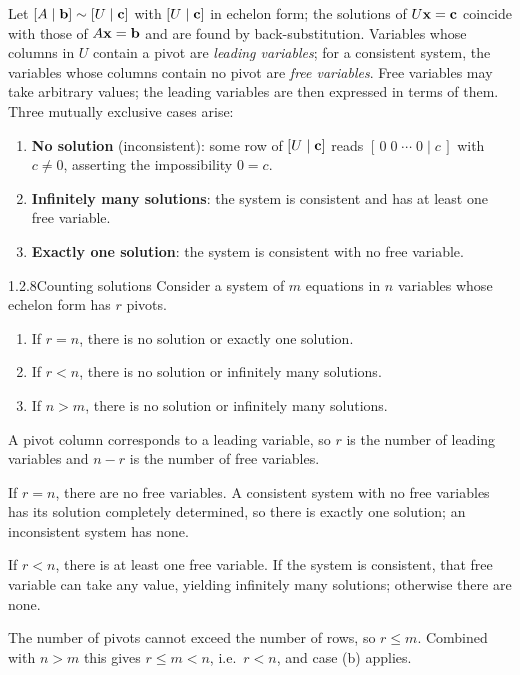 Let $[A\mid\mathbf{b}]\sim[U\mid\mathbf{c}]$ with $[U\mid\mathbf{c}]$ in echelon form; the solutions of $U\mathbf{x}=\mathbf{c}$ coincide with those of $A\mathbf{x}=\mathbf{b}$ and are found by back-substitution. Variables whose columns in $U$ contain a pivot are \emph{leading variables}; for a consistent system, the variables whose columns contain no pivot are \emph{free variables}. Free variables may take arbitrary values; the leading variables are then expressed in terms of them. Three mutually exclusive cases arise:
\begin{enumerate}[label=\textup{(\roman*)},leftmargin=2.4em,itemsep=1pt]
\item \textbf{No solution} (inconsistent): some row of $[U\mid\mathbf{c}]$ reads $[\,0\;0\;\cdots\;0\mid c\,]$ with $c\neq0$, asserting the impossibility $0=c$.
\item \textbf{Infinitely many solutions}: the system is consistent and has at least one free variable.
\item \textbf{Exactly one solution}: the system is consistent with no free variable.
\end{enumerate}

\begin{thms}{1.2.8}{Counting solutions}
Consider a system of $m$ equations in $n$ variables whose echelon form has $r$ pivots.
\begin{enumerate}[label=\textup{(\alph*)},leftmargin=2.2em,itemsep=1pt]
\item If $r=n$, there is no solution or exactly one solution.
\item If $r<n$, there is no solution or infinitely many solutions.
\item If $n>m$, there is no solution or infinitely many solutions.
\end{enumerate}
\end{thms}

\begin{prf}
A pivot column corresponds to a leading variable, so $r$ is the number of leading variables and $n-r$ is the number of free variables.

 If $r=n$, there are no free variables. A consistent system with no free variables has its solution completely determined, so there is exactly one solution; an inconsistent system has none.

 If $r<n$, there is at least one free variable. If the system is consistent, that free variable can take any value, yielding infinitely many solutions; otherwise there are none.

 The number of pivots cannot exceed the number of rows, so $r\le m$. Combined with $n>m$ this gives $r\le m<n$, i.e.\ $r<n$, and case (b) applies.
\end{prf}

